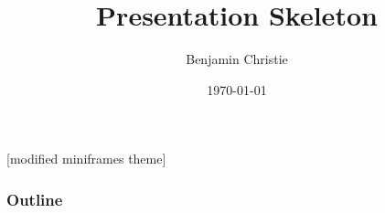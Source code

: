\documentclass[10pt]{beamer}
\title{Presentation Skeleton}
\author{Benjamin Christie}
\date{\today}
\theoremstyle{definition}
\begin{document}
[modified miniframes theme]
\begin{frame}
	\titlepage
\end{frame}
\begin{frame}
	\frametitle{Outline}
	\tableofcontents
\end{frame}
\section{}
\begin{frame}
	\frametitle{}
\end{frame}
\end{document}
